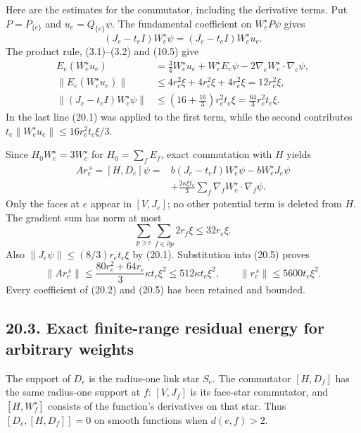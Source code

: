 \documentclass[
]{article}
\begin{document}
Here are the estimates for the commutator, including the derivative
terms. Put \(P=P_{\{e\}}\) and \(u_e=Q_{\{e\}}\psi\). The fundamental
coefficient on \(W_e^\star P\psi\) gives \[
(J_e-t_eI)W_e^\star\psi=(J_e-t_eI)W_e^\star u_e .
\] The product rule, (3.1)--(3.2) and (10.5) give \[
\begin{aligned}
E_e(W_e^\star u_e)
 &=\tfrac34W_e^\star u_e+W_e^\star E_e\psi
            -2\nabla_eW_e^\star\cdot\nabla_e\psi,\\
\|E_e(W_e^\star u_e)\|
 &\le4r_e^2\xi+4r_e^2\xi+4r_e^2\xi=12r_e^2\xi,\\
\|(J_e-t_eI)W_e^\star\psi\|
 &\le\left(16+\frac{16}{3}\right)r_e^2t_e\xi
   =\frac{64}{3}r_e^2t_e\xi .
\end{aligned}                                                   \tag{20.4}
\] In the last line (20.1) was applied to the first term, while the
second contributes \(t_e\|W_e^\star u_e\|\le16r_e^2t_e\xi/3\).

Since \(H_0W_e^\star=3W_e^\star\) for \(H_0=\sum_fE_f\), exact
commutation with \(H\) yields \[
\begin{aligned}
Ar_e^{\,s}=[H,D_e]\psi
={}&b(J_e-t_eI)W_e^\star\psi
     -bW_e^\star J_e\psi\\
 &+\frac{2\kappa\xi t_e}{3}
       \sum_f\nabla_fW_e^\star\cdot\nabla_f\psi .
\end{aligned}                                                   \tag{20.5}
\] Only the faces at \(e\) appear in \([V,J_e]\); no other potential
term is deleted from \(H\). The gradient sum has norm at most \[
\sum_{p\ni e}\sum_{f\in\partial p}2r_f\xi
 \le32r_e\xi.
\] Also \(\|J_e\psi\|\le(8/3)r_et_e\xi\) by (20.1). Substitution into
(20.5) proves \[
\|Ar_e^{\,s}\|
 \le\frac{80r_e^2+64r_e}{3}\kappa t_e\xi^2
 \le512\kappa t_e\xi^2,\qquad
\|r_e^{\,s}\|\le5600t_e\xi^2 .
                                                               \tag{20.6}
\] Every coefficient of (20.2) and (20.5) has been retained and bounded.

\subsection{20.3. Exact finite-range residual energy for arbitrary
weights}\label{exact-finite-range-residual-energy-for-arbitrary-weights}

The support of \(D_e\) is the radius-one link star \(S_e\). The
commutator \([H,D_f]\) has the same radius-one support at \(f\):
\([V,J_f]\) is its face-star commutator, and \([H,W_f^\star]\) consists
of the function's derivatives on that star. Thus \([D_e,[H,D_f]]=0\) on
smooth functions when \(d(e,f)>2\).
\end{document}

